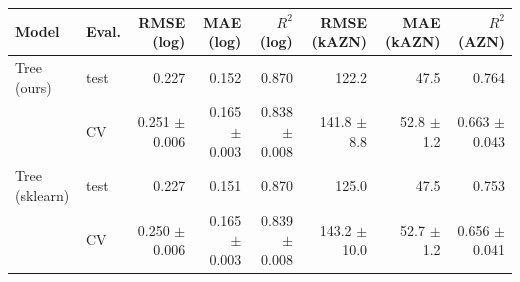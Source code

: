 \begin{tabular}{llrrrrrr}
\toprule
Model & Eval. & RMSE (log) & MAE (log) & $R^2$ (log) & RMSE (kAZN) & MAE (kAZN) & $R^2$ (AZN) \\
\midrule
Tree (ours) & test & 0.227 & 0.152 & 0.870 & 122.2 & 47.5 & 0.764 \\
 & CV & 0.251 $\pm$ 0.006 & 0.165 $\pm$ 0.003 & 0.838 $\pm$ 0.008 & 141.8 $\pm$ 8.8 & 52.8 $\pm$ 1.2 & 0.663 $\pm$ 0.043 \\
Tree (sklearn) & test & 0.227 & 0.151 & 0.870 & 125.0 & 47.5 & 0.753 \\
 & CV & 0.250 $\pm$ 0.006 & 0.165 $\pm$ 0.003 & 0.839 $\pm$ 0.008 & 143.2 $\pm$ 10.0 & 52.7 $\pm$ 1.2 & 0.656 $\pm$ 0.041 \\
\bottomrule
\end{tabular}
